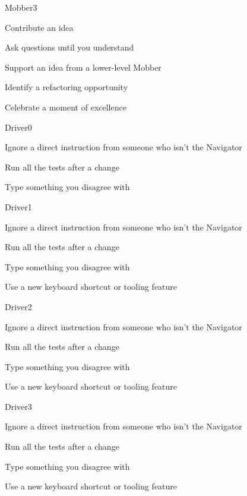\documentclass[letterpaper,20pt]{extarticle}
\begin{document}
\begin{role}{Mobber}{3}
  \item Contribute an idea
  \item Ask questions until you understand
  \item Support an idea from a lower-level Mobber
  \item Identify a refactoring opportunity
  \item Celebrate a moment of excellence
\end{role}



\begin{role}{Driver}{0}
  \item Ignore a direct instruction from someone who isn't the Navigator
  \item Run all the tests after a change
  \item Type something you disagree with
\end{role}

\begin{role}{Driver}{1}
  \item Ignore a direct instruction from someone who isn't the Navigator
  \item Run all the tests after a change
  \item Type something you disagree with
  \item Use a new keyboard shortcut or tooling feature
\end{role}

\begin{role}{Driver}{2}
  \item Ignore a direct instruction from someone who isn't the Navigator
  \item Run all the tests after a change
  \item Type something you disagree with
  \item Use a new keyboard shortcut or tooling feature
\end{role}

\begin{role}{Driver}{3}
  \item Ignore a direct instruction from someone who isn't the Navigator
  \item Run all the tests after a change
  \item Type something you disagree with
  \item Use a new keyboard shortcut or tooling feature
\end{role}
\end{document}
